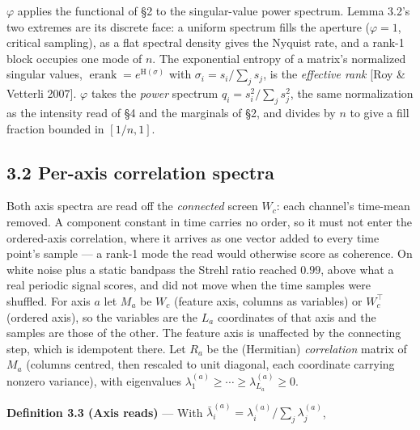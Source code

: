 \documentclass[10pt,letterpaper,twocolumn]{article}
\begin{document}
\(\varphi\) applies the functional of §2 to the singular-value power spectrum. Lemma 3.2's two extremes are its discrete face: a uniform spectrum fills the aperture (\(\varphi=1\), critical sampling), as a flat spectral density gives the Nyquist rate, and a rank-1 block occupies one mode of \(n\). The exponential entropy of a matrix's normalized singular values, \(\operatorname{erank}=e^{\mathrm H(\sigma)}\) with \(\sigma_i=s_i/\sum_j s_j\), is the \emph{effective rank} {[}Roy \& Vetterli 2007{]}. \(\varphi\) takes the \emph{power} spectrum \(q_i=s_i^2/\sum_j s_j^2\), the same normalization as the intensity read of §4 and the marginals of §2, and divides by \(n\) to give a fill fraction bounded in \([1/n,1]\).

\subsection{3.2 Per-axis correlation spectra}\label{32-per-axis-correlation-spectra}

Both axis spectra are read off the \emph{connected} screen \(W_c\): each channel's time-mean removed. A component constant in time carries no order, so it must not enter the ordered-axis correlation, where it arrives as one vector added to every time point's sample --- a rank-1 mode the read would otherwise score as coherence. On white noise plus a static bandpass the Strehl ratio reached \(0.99\), above what a real periodic signal scores, and did not move when the time samples were shuffled. For axis \(a\) let \(M_a\) be \(W_c\) (feature axis, columns as variables) or \(W_c^{\mathsf\top}\) (ordered axis), so the variables are the \(L_a\) coordinates of that axis and the samples are those of the other. The feature axis is unaffected by the connecting step, which is idempotent there. Let \(R_a\) be the (Hermitian) \emph{correlation} matrix of \(M_a\) (columns centred, then rescaled to unit diagonal, each coordinate carrying nonzero variance), with eigenvalues \(\lambda^{(a)}_1\ge\cdots\ge\lambda^{(a)}_{L_a}\ge 0\).

\textbf{Definition 3.3 (Axis reads)} --- With \(\bar\lambda^{(a)}_i=\lambda^{(a)}_i/\sum_j\lambda^{(a)}_j\),

\end{document}

